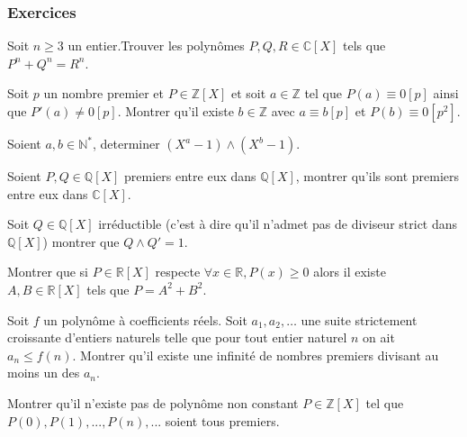 \subsubsection{Exercices}

\begin{exo}[Liouville,D]
Soit $n\geq 3 $ un entier.Trouver les polynômes $P,Q,R\in \mathbb{C}[X]$ tels que $P^n+Q^n=R^n$. 
\end{exo}


\begin{exo}[Hensel,M-D]
Soit $p$ un nombre premier et $P\in \mathbb{Z}[X]$ et soit $a\in \mathbb{Z}$ tel que $P(a)\equiv 0 [p]$ ainsi que $P'(a)\neq 0 [p] $. Montrer qu'il existe $b\in \mathbb{Z}$ avec $a\equiv b[p]$ et $P(b)\equiv 0 [p^2]$.
\end{exo}

\begin{exo}[Euclide,M]
Soient $a,b\in \mathbb{N}^*$, determiner $(X^a-1)\wedge(X^b-1) $.
\end{exo}

\begin{exo}
Soient $P,Q\in \mathbb{Q}[X]$ premiers entre eux dans $\mathbb{Q}[X]$, montrer qu'ils sont premiers entre eux dans $\mathbb{C}[X]$.
\end{exo}

\begin{exo}
Soit $Q\in \mathbb{Q}[X]$ irréductible (c'est à dire qu'il n'admet pas de diviseur strict dans $\mathbb{Q}[X]$) montrer que $Q\wedge Q'=1$.
\end{exo}

\begin{exo}
Montrer que si $P\in \mathbb{R}[X]$ respecte $\forall x \in \mathbb{R}, P(x)\geq 0$ alors il existe $A,B\in \mathbb{R}[X]$ tels que $P=A^2+B^2$.
\end{exo}


\begin{exo}[M-D]
Soit $f$ un polynôme à coefficients réels. Soit $a_1,a_2,\ldots$ une suite strictement croissante d'entiers naturels telle que pour tout entier naturel $n$ on ait $a_n\le f(n)$. Montrer qu'il existe une infinité de nombres premiers divisant au moins un des $a_n$.
\end{exo}


\begin{exo}[F-M]
Montrer qu'il n'existe pas de polynôme non constant $P\in \mathbb{Z}[X]$ tel que $P(0),P(1),...,P(n),...$ soient tous premiers.
\end{exo}


